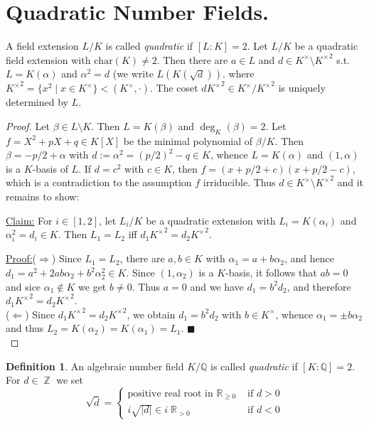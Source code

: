 \documentclass[12pt,a4paper]{report}
\theoremstyle{definition}
\newtheorem{defn}[theorem]{Definition}
\theoremstyle{num.custom-title}
\newenvironment{claim}[1]{\par\noindent\underline{Claim#1:}\space}{} %
\newenvironment{claimproof}[1]{\par\noindent\underline{Proof:}\space#1}{\leavevmode\unskip\penalty9999 \hbox{}\nobreak\hfill\quad\hbox{$\blacksquare$}} %
\DeclareMathOperator{\R}{\mathbb{R}}
\DeclareMathOperator{\Z}{\mathbb{Z}}
\DeclareMathOperator{\imp}{\Rightarrow}
\DeclareMathOperator{\pmi}{\Leftarrow}
\DeclareMathOperator{\sm}{\setminus}
\newcommand{\Q}{\mathbb{Q}}
\begin{document}
\section{Quadratic Number Fields.}
A field extension $L/K$ is called \emph{quadratic} if $[L:K]=2$. Let $L/K$ be a quadratic field extension with $\text{char}(K) \neq 2$. Then there are $a \in L$ and $d \in K^\times \sm {K^\times}^2$ s.t. $L=K(\alpha)$ and $\alpha^2=d$ (we write $L(K(\sqrt{d}))$. where ${K^\times}^2 = \{x^2 \mid x \in K^\times\} < (K^\times,\cdot)$. The coset $d {K^\times}^2 \in K^\times / {K^\times}^2$ is uniquely determined by $L$.
\begin{proof}
Let $\beta \in L \sm K$. Then $L=K(\beta)$ and $\deg_K(\beta)=2$. Let $f=X^2+pX+q \in K[X]$ be the minimal polynomial of $\beta / K$. Then $\beta = -p/2+\alpha$ with $d:=\alpha^2=(p/2)^2-q \in K$, whence $L=K(\alpha)$ and $(1,\alpha)$ is a $K$-basis of $L$. If $d=c^2$ with $c \in K$, then $f=(x+p/2+c)(x+p/2-c)$, which is a contradiction to the assumption $f$ irriducible. Thus $d \in K^\times \sm {K^\times}^2$ and it remains to show: 
\begin{claim}{}
For $i \in [1,2]$, let $L_i/K$ be a quadratic extension with $L_i=K(\alpha_i)$ and $\alpha_i^2 = d_i \in K$. Then $L_1=L_2$ iff $d_1 {K^\times}^2 = d_2 {K^\times}^2$.
\begin{claimproof}
($\imp$) Since $L_1=L_2$, there are $a,b \in K$ with $\alpha_1=a+b\alpha_2$, and hence $d_1=a^2+2ab\alpha_2+b^2\alpha_2^2 \in K$. Since $(1,\alpha_2)$ is a $K$-basis, it follows that $ab=0$ and sice $\alpha_1 \not\in K$ we get $b \neq 0$. Thus $a=0$ and we have $d_1=b^2 d_2$, and therefore $d_1 {K^\times}^2 = d_2 {K^\times}^2$.\\
($\pmi$) Since $d_1 {K^\times}^2 = d_2 {K^\times}^2$, we obtain $d_1 = b^2 d_2$ with $b \in K^\times$, whence $\alpha_1 = \pm b \alpha_2$ and thus $L_2 = K(\alpha_2) = K(\alpha_1) = L_1$.
\end{claimproof}\ \\
\end{claim}
\end{proof}

\begin{defn}
An algebraic number field $K/\Q$ is called \emph{quadratic} if $[K:\Q]=2$. For $d \in \Z$ we set
\[
\sqrt{d} =
\begin{cases}
\text{positive real root in } \R_{\geq 0} &\text{ if } d>0\\
i\sqrt{|d|} \in i \R_{>0} & \text{ if } d<0
\end{cases}
\]
\end{defn}
\end{document}
